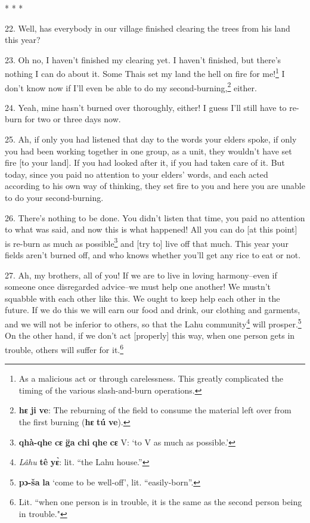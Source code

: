\begin{center}
* * *
\end{center}

22. Well, has everybody in our village finished clearing the trees from his land
this year?

23. Oh no, I haven't finished my clearing yet. I haven't finished, but there's
nothing I can do about it. Some Thais set my land the hell on fire for me!\footnote{As a malicious act or through carelessness. This greatly complicated the timing of the various slash-and-burn operations.}
I don't know now if I'll even be able to do my second-burning,\footnote{\textbf{hɛ} \textbf{ji} \textbf{ve}: The reburning of the field to consume the material left over from the first burning (\textbf{hɛ} \textbf{tú} \textbf{ve}).} either.

24. Yeah, mine hasn't burned over thoroughly, either! I guess I'll still have to
re-burn for two or three days now.

25. Ah, if only you had listened that day to the words your elders spoke, if only
you had been working together in one group, as a unit, they wouldn't have set fire
[to your land]. If you had looked after it, if you had taken care of it. But today,
since you paid no attention to your elders' words, and each acted according to
his own way of thinking, they set fire to you and here you are unable to do your
second-burning.

26. There's nothing to be done. You didn't listen that time, you paid no attention
to what was said, and now this is what happened! All you can do [at this point]
is re-burn as much as possible\footnote{\textbf{qhà-qhe} \textbf{cɛ} \textbf{g̈a} \textbf{chi} \textbf{qhe} \textbf{cɛ} V: `to V as much as possible.'} and [try to] live off that much. This year your
fields aren't burned off, and who knows whether you'll get any rice to eat or not.

27. Ah, my brothers, all of you! If we are to live in loving harmony--even if
someone once disregarded advice--we must help one another! We mustn't squabble
with each other like this. We ought to keep help each other in the future. If we
do this we will earn our food and drink, our clothing and garments, and we will
not be inferior to others, so that the Lahu community\footnote{\textit{ Lâh}\textit{\emph{u}} \textbf{tê} \textbf{yɛ̀}: lit. ``the Lahu house.''} will prosper.\footnote{\textbf{pɔ-ša} \textbf{la} `come to be well-off', lit. ``easily-born''.} On
the other hand, if we don't act [properly] this way, when one person gets in trouble,
others will suffer for it.\footnote{Lit. ``when one person is in trouble, it is the same as the second person being in trouble."}

